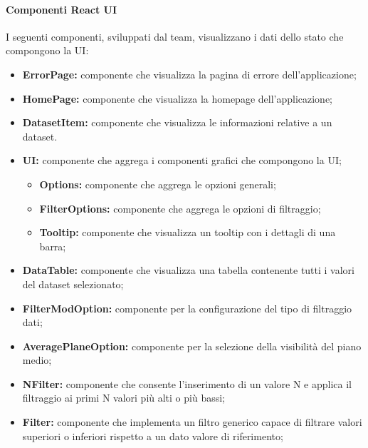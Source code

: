 \paragraph{Componenti React UI}
I seguenti componenti, sviluppati dal team, visualizzano i dati dello stato che
compongono la UI:
\begin{itemize}
      \item \textbf{ErrorPage:} componente che visualizza la pagina di errore dell'applicazione;
      \item \textbf{HomePage:} componente che visualizza la homepage dell'applicazione;
      \item \textbf{DatasetItem:} componente che visualizza le informazioni relative a un dataset.
      \item \textbf{UI:} componente che aggrega i componenti grafici che compongono la UI;
            \begin{itemize}
                  \item \textbf{Options:} componente che aggrega le opzioni generali;
                  \item \textbf{FilterOptions:} componente che aggrega le opzioni di filtraggio;
                  \item \textbf{Tooltip:} componente che visualizza un tooltip con i dettagli di una barra;
            \end{itemize}
      \item \textbf{DataTable:} componente che visualizza una tabella contenente tutti i valori del dataset selezionato;
      \item \textbf{FilterModOption:} componente per la configurazione del tipo di filtraggio dati;
      \item \textbf{AveragePlaneOption:} componente per la selezione della visibilità del piano medio;
      \item \textbf{NFilter:} componente che consente l'inserimento di un valore N e applica il filtraggio ai primi N valori più alti o più bassi;
      \item \textbf{Filter:} componente che implementa un filtro generico capace di filtrare valori superiori o inferiori rispetto a un dato valore di riferimento;
\end{itemize}
